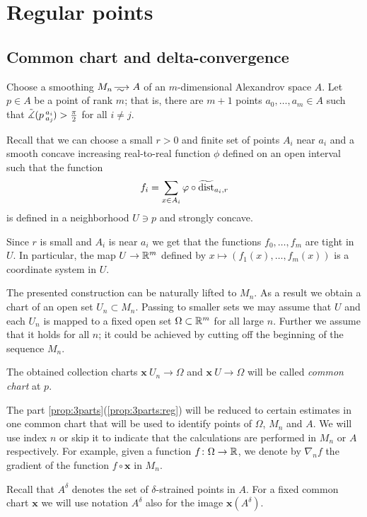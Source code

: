 \section{Regular points}\label{sec:ref}

\subsection{Common chart and delta-convergence}

Choose a smoothing $M_n\smooths{} A$ of an $m$-dimensional Alexandrov space $A$.
Let $p\in A$ be a point of rank $m$; that is, there are $m+1$ points $a_0,\dots, a_m\in A$ such that 
$\tilde\measuredangle(p\,{}^{a_i}_{a_j}\hspace{-0.2ex})>\tfrac\pi2$ for all $i\ne j$.

Recall that we can choose a small $r>0$ and finite set of points $A_i$ near $a_i$ and a smooth concave increasing real-to-real function $\phi$ defined on an open interval such that the function
\[f_i=\sum_{x\in A_i}\varphi\circ\widetilde{\operatorname{\rm dist}}_{a_i,r}\]
is defined in a neighborhood $U\ni p$ and strongly concave.

Since $r$ is small and $A_i$ is near $a_i$ we get that the functions $f_0, \dots, f_m$ are tight in $U$.
In particular, the map $U\to\mathbb{R}^m$ defined by $x\mapsto (f_1(x),\dots,f_m(x))$ is a coordinate system in $U$.

The presented construction can be naturally lifted to $M_n$.
As a result we obtain a chart of an open set $U_n\subset M_n$.
Passing to smaller sets we may assume that $U$ and each $U_n$ is mapped to a fixed open set $\Omega\subset\mathbb{R}^m$ for all large $n$.
Further we assume that it holds for all $n$; it could be achieved by cutting off the beginning of the sequence $M_n$.

The obtained collection charts $\bm{x}\: U_n\to \Omega$ and $\bm{x}\: U\to \Omega$ will be called \emph{common chart} at $p$.

The part \ref{prop:3parts}(\ref{prop:3parts:reg}) will be reduced to certain estimates in one common chart that will be used to identify points of $\Omega$, $M_n$ and $A$.
We will use index $n$ or skip it to indicate that the calculations are performed in $M_n$ or $A$ respectively.
For example, given a function $f\colon\Omega\to \mathbb{R}$, we denote by $\nabla_nf$ the gradient of the function $f\circ \bm{x}$ in $M_n$.

Recall that $A^\delta$ denotes the set of $\delta$-strained points in $A$.
For a fixed common chart $\bm{x}$ we will use notation $A^\delta$ also for the image $\bm{x}(A^\delta)$.

